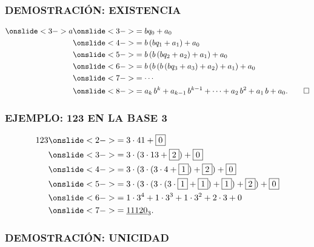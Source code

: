 \begin{frame}
  \frametitle{DEMOSTRACIÓN: EXISTENCIA}

  \begin{align*}
    \onslide<3->{a} & \onslide<3->{= b q_0 + a_0} \\
                    & \onslide<4->{= b \, (b q_1 + a_1) + a_0} \\
                    & \onslide<5->{= b \, (b \, (b q_2 + a_2) + a_1) + a_0} \\
                    & \onslide<6->{= b \, (b \, (b \, (b q_3 + a_3) + a_2) + a_1) + a_0} \\
                    & \onslide<7->{= \cdots} \\
                    & \onslide<8->{= a_k\,b^k + a_{k-1}\,b^{k-1} + \cdots + a_2\,b^2 + a_1\,b + a_0. \qed}
  \end{align*}
\end{frame}

\begin{frame}
  \frametitle{EJEMPLO: 123 EN LA BASE 3}

  \begin{align*}
    123 & \onslide<2->{= 3\cdot 41 + \boxed{0}} \\
        & \onslide<3->{= 3\cdot (3\cdot 13 + \boxed{2}) + \boxed{0}} \\
        & \onslide<4->{= 3\cdot (3\cdot (3\cdot 4 + \boxed{1}) + \boxed{2}) + \boxed{0}} \\
        & \onslide<5->{= 3\cdot (3\cdot (3\cdot (3\cdot \boxed{1} + \boxed{1}) + \boxed{1}) + \boxed{2}) + \boxed{0}} \\
        & \onslide<6->{= 1\cdot 3^4 + 1\cdot 3^3 + 1\cdot 3^2 + 2\cdot 3 + 0} \\
        & \onslide<7->{= \underline{11120}_3.}
  \end{align*}
\end{frame}

\begin{frame}
  \frametitle{DEMOSTRACIÓN: UNICIDAD}




\end{frame}

